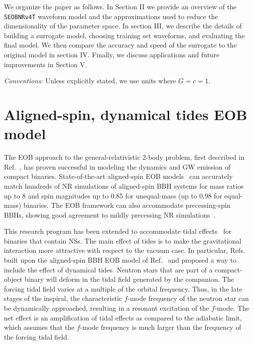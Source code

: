 \documentclass[prd,aps,letter,twocolumn,floatfix,notitlepage,nofootinbib]{revtex4-1}
\begin{document}
We organize the paper as follows. In Section II we provide an overview of the \texttt{SEOBNRv4T} waveform model and the approximations used to reduce the dimensionality of the parameter space. In section III, we describe the details of building a surrogate model, choosing training set waveforms, and evaluating the final model. We then compare the accuracy and speed of the surrogate to the original model in section IV. Finally, we discuss applications and future improvements in Section V.

\textit{Conventions:} Unless explicitly stated, we use units where $G=c=1$.


\section{Aligned-spin, dynamical tides EOB model}
\label{sec:eob}

The EOB approach to the general-relativistic 2-body problem, first described in Ref.~\cite{Buonanno:1998gg}, has proven successful in modeling the dynamics and GW emission of compact binaries. State-of-the-art aligned-spin EOB models~\cite{Bohe:2016gbl,Nagar:2017jdw} can accurately match hundreds of NR simulations of aligned-spin BBH systems for mass ratios up to 8 and spin magnitudes up to 0.85 for unequal-mass (up to 0.98 for equal-mass) binaries. The EOB framework can also accommodate precessing-spin BBHs, showing good agreement to mildly precessing NR simulations~\cite{Babak:2016tgq}. 

This research program has been extended to accommodate tidal effects~\cite{Damour:2009wj,Vines:2010ca,Damour:2012yf,Bini:2012gu,Bernuzzi:2014owa,Hinderer:2016eia,Steinhoff:2016rfi,Dietrich:2017feu} for binaries that contain NSs. The main effect of tides is to make the gravitational interaction more attractive with respect to the vacuum case. In particular, Refs.~\cite{Hinderer:2016eia,Steinhoff:2016rfi} built upon the aligned-spin BBH EOB model of Ref.~\cite{Taracchini:2013rva} and proposed a way to include the effect of dynamical tides. Neutron stars that are part of a compact-object binary will deform in the tidal field generated by the companion. The forcing tidal field varies at a multiple of the orbital frequency. Thus, in the late stages of the inspiral, the characteristic $f$-mode frequency of the neutron star can be dynamically approached, resulting in a resonant excitation of the $f$-mode. The net effect is an amplification of tidal effects as compared to the adiabatic limit, which assumes that the $f$-mode frequency is much larger than the frequency of the forcing tidal field. 
\end{document}
